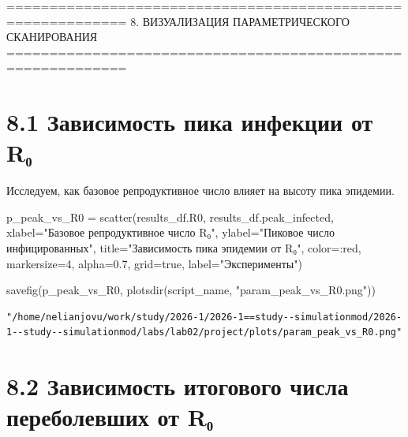 \documentclass[
  12pt,
  a4paper,
  DIV=11,
  numbers=noendperiod]{scrreprt}
\newenvironment{Shaded}{\begin{snugshade}}{\end{snugshade}}
\newcommand{\ConstantTok}[1]{\textcolor[rgb]{0.56,0.35,0.01}{#1}}
\newcommand{\FloatTok}[1]{\textcolor[rgb]{0.68,0.00,0.00}{#1}}
\newcommand{\FunctionTok}[1]{\textcolor[rgb]{0.28,0.35,0.67}{#1}}
\newcommand{\NormalTok}[1]{\textcolor[rgb]{0.00,0.23,0.31}{#1}}
\newcommand{\OperatorTok}[1]{\textcolor[rgb]{0.37,0.37,0.37}{#1}}
\newcommand{\StringTok}[1]{\textcolor[rgb]{0.13,0.47,0.30}{#1}}
\begin{document}
============================================================ 8.
ВИЗУАЛИЗАЦИЯ ПАРАМЕТРИЧЕСКОГО СКАНИРОВАНИЯ
============================================================

\section{8.1 Зависимость пика инфекции от
R₀}\label{ux437ux430ux432ux438ux441ux438ux43cux43eux441ux442ux44c-ux43fux438ux43aux430-ux438ux43dux444ux435ux43aux446ux438ux438-ux43eux442-rux2080}

Исследуем, как базовое репродуктивное число влияет на высоту пика
эпидемии.

\begin{Shaded}
\begin{Highlighting}[]
\NormalTok{p\_peak\_vs\_R0 }\OperatorTok{=} \FunctionTok{scatter}\NormalTok{(results\_df.R0, results\_df.peak\_infected,}
\NormalTok{    xlabel}\OperatorTok{=}\StringTok{"Базовое репродуктивное число R₀"}\NormalTok{,}
\NormalTok{    ylabel}\OperatorTok{=}\StringTok{"Пиковое число инфицированных"}\NormalTok{,}
\NormalTok{    title}\OperatorTok{=}\StringTok{"Зависимость пика эпидемии от R₀"}\NormalTok{,}
\NormalTok{    color}\OperatorTok{=:}\NormalTok{red,}
\NormalTok{    markersize}\OperatorTok{=}\FloatTok{4}\NormalTok{,}
\NormalTok{    alpha}\OperatorTok{=}\FloatTok{0.7}\NormalTok{,}
\NormalTok{    grid}\OperatorTok{=}\ConstantTok{true}\NormalTok{,}
\NormalTok{    label}\OperatorTok{=}\StringTok{"Эксперименты"}\NormalTok{)}

\FunctionTok{savefig}\NormalTok{(p\_peak\_vs\_R0, }\FunctionTok{plotsdir}\NormalTok{(script\_name, }\StringTok{"param\_peak\_vs\_R0.png"}\NormalTok{))}
\end{Highlighting}
\end{Shaded}

\begin{verbatim}
"/home/nelianjovu/work/study/2026-1/2026-1==study--simulationmod/2026-1--study--simulationmod/labs/lab02/project/plots/param_peak_vs_R0.png"
\end{verbatim}

\section{8.2 Зависимость итогового числа переболевших от
R₀}\label{ux437ux430ux432ux438ux441ux438ux43cux43eux441ux442ux44c-ux438ux442ux43eux433ux43eux432ux43eux433ux43e-ux447ux438ux441ux43bux430-ux43fux435ux440ux435ux431ux43eux43bux435ux432ux448ux438ux445-ux43eux442-rux2080}
\end{document}
